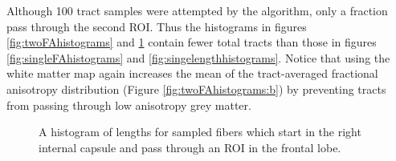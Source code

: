 Although 100 tract samples were attempted by the algorithm, only a fraction pass through the second ROI.  Thus the histograms in figures \ref{fig:twoFAhistograms} and \ref{fig:twolengthhistograms} contain fewer total tracts than those in figures \ref{fig:singleFAhistograms} and \ref{fig:singelengthhistograms}.  Notice that using the white matter map again increases the mean of the tract-averaged fractional anisotropy distribution (Figure \ref{fig:twoFAhistograms:b}) by preventing tracts from passing through low anisotropy grey matter.

\begin{figure} \label{fig:twolengthhistograms}
	\caption{A histogram of lengths for sampled fibers which start in the right internal capsule and pass through an ROI in the frontal lobe. }
\end{figure}

